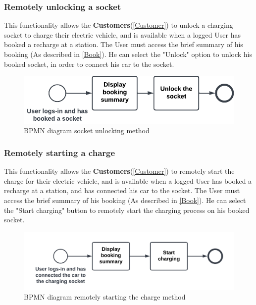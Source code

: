 \subsubsection{Remotely unlocking a socket}
This functionality allows the \textbf{Customers}(\ref{Customer}) to unlock a charging socket to charge their electric vehicle, and is available when a logged User has booked a recharge at a station. 
The User must access the brief summary of his booking (As described in \ref{Book}).
He can select the "Unlock" option to unlock his booked socket, in order to connect his car to the socket.
\begin{figure}[H]
    \begin{center}
        \includegraphics[scale=0.3]{img/fun-sock-unl.png}
        \caption{BPMN diagram socket unlocking method}
    \end{center}
\end{figure}
\subsubsection{Remotely starting a charge}
This functionality allows the \textbf{Customers}(\ref{Customer}) to remotely start the charge for their electric vehicle, and is available when a logged User has booked a recharge at a station, and has connected his car to the socket. 
The User must access the brief summary of his booking (As described in \ref{Book}).
He can select the "Start charging" button to remotely start the charging process on his booked socket.
\begin{figure}[H]
    \begin{center}
        \includegraphics[scale=0.2]{img/fun-rem-ch.png}
        \caption{BPMN diagram remotely starting the charge method}
    \end{center}
\end{figure}

